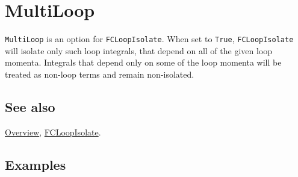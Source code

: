 \documentclass[../FeynCalcManual.tex]{subfiles}
\begin{document}
\hypertarget{multiloop}{%
\section{MultiLoop}\label{multiloop}}

\texttt{MultiLoop} is an option for \texttt{FCLoopIsolate}. When set to
\texttt{True}, \texttt{FCLoopIsolate} will isolate only such loop
integrals, that depend on all of the given loop momenta. Integrals that
depend only on some of the loop momenta will be treated as non-loop
terms and remain non-isolated.

\subsection{See also}

\hyperlink{toc}{Overview}, \hyperlink{fcloopisolate}{FCLoopIsolate}.

\subsection{Examples}
\end{document}
